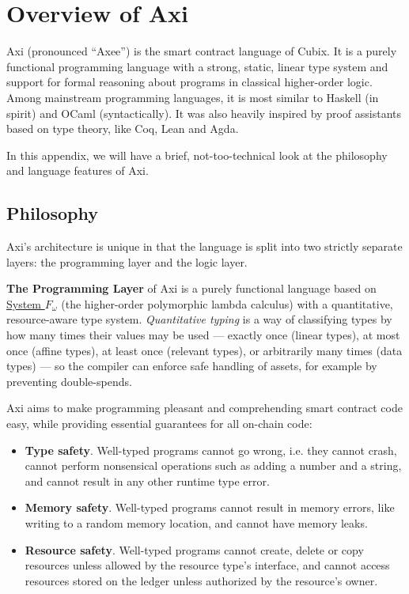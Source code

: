 \section{Overview of Axi}

Axi (pronounced ``Axee'') is the smart contract language of Cubix. It is a purely functional programming language with a strong, static, linear type system and support for formal reasoning about programs in classical higher-order logic. Among mainstream programming languages, it is most similar to Haskell (in spirit) and OCaml (syntactically). It was also heavily inspired by proof assistants based on type theory, like Coq, Lean and Agda.

In this appendix, we will have a brief, not-too-technical look at the philosophy and language features of Axi.

\subsection{Philosophy}

Axi's architecture is unique in that the language is split into two strictly separate layers: the programming layer and the logic layer.

\textbf{The Programming Layer} of Axi is a purely functional language based on \href{https://en.wikipedia.org/wiki/System_F#System_F%CF%89}{System \(F_{\omega}\)} (the higher-order polymorphic lambda calculus) with a quantitative, resource-aware type system. \textit{Quantitative typing} is a way of classifying types by how many times their values may be used --- exactly once (linear types), at most once (affine types), at least once (relevant types), or arbitrarily many times (data types) --- so the compiler can enforce safe handling of assets, for example by preventing double-spends.

Axi aims to make programming pleasant and comprehending smart contract code easy, while providing essential guarantees for all on-chain code:

\begin{itemize}
  \item \textbf{Type safety}. Well-typed programs cannot go wrong, i.e. they cannot crash, cannot perform nonsensical operations such as adding a number and a string, and cannot result in any other runtime type error.
  \item \textbf{Memory safety}. Well-typed programs cannot result in memory errors, like writing to a random memory location, and cannot have memory leaks.
  \item \textbf{Resource safety}. Well-typed programs cannot create, delete or copy resources unless allowed by the resource type's interface, and cannot access resources stored on the ledger unless authorized by the resource's owner.
\end{itemize}

